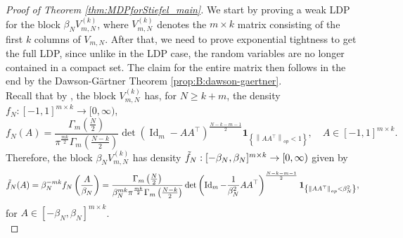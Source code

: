 \documentclass[11pt,a4paper,twoside]{article}
\theoremstyle{definition}
\begin{document}
	\begin{proof}[Proof of Theorem \ref{thm:MDPforStiefel_main}]
		We start by proving a weak LDP for the block $\beta_N V_{m,N}^{(k)}$, where $V_{m,N}^{(k)}$ denotes the $m\times k$ matrix consisting of the first $k$ columns of $V_{m,N}$. After that, we need to prove exponential tightness to get the full LDP, since unlike in the LDP case, the random variables are no longer contained in a compact set. The claim for the entire matrix then follows in the end by the Dawson-Gärtner Theorem \ref{prop:B:dawson-gaertner}. \\
		
		\noindent Recall that by \cite[Lemma 2.5]{jiang2006many}, the block $V_{m,N}^{(k)}$ has, for $N\ge k+m$, the density $f_N:[-1,1]^{m\times k}\to [0,\infty)$,
		$$
		f_N(A)=\frac{\Gamma_m\left(\frac{N}{2}\right)}{\pi^{\frac{m k}{2}} \Gamma_m\left(\frac{N-k}{2}\right)} \operatorname{det}\left(\operatorname{Id}_{m}-A A^\top\right)^{\frac{N-k-m-1}{2}} \mathbf{1}_{\left\{\left\|A A^\top\right\|_{op}<1\right\}}, \quad A \in[-1,1]^{m \times k}.
		$$
		Therefore, the block $\beta_N V_{m,N}^{(k)}$ has density $\Tilde{f}_N:[-\beta_N,\beta_N]^{m\times k}\to [0,\infty)$ given by
		$$
		\Tilde{f}_N(A) = \beta_N^{-mk}f_N\left(\frac{A}{\beta_N}\right)=\frac{\Gamma_m\left(\frac{N}{2}\right)}{\beta_N^{mk}\pi^{\frac{m k}{2}} \Gamma_m\left(\frac{N-k}{2}\right)} \operatorname{det}\left(\operatorname{Id}_{m}-\frac{1}{\beta_N^2}A A^\top\right)^{\frac{N-k-m-1}{2}} \mathbf{1}_{\left\{\left\|A A^\top\right\|_{op}<\beta_N^2 \right\}},
		$$
		for $A \in[-\beta_N,\beta_N]^{m\times k}$. \\
		

\end{proof}
\end{document}

